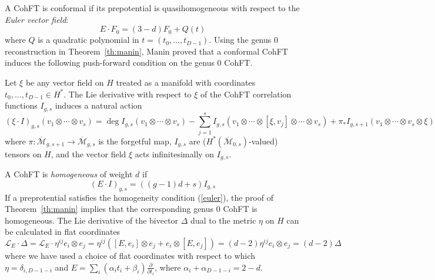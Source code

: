 \documentclass[11pt]{article}
\newcommand{\modm}{\mathcal{M}}
\theoremstyle{plain}
\theoremstyle{definition}
\newcommand{\cl}{\mathcal{L}}
\begin{document}
A CohFT is conformal if its prepotential is quasihomogeneous with respect to the {\em Euler vector field}:
\begin{equation}  \label{euler}
 E\cdot F_0=(3-d)F_0+Q(t)
 \end{equation}
where $Q$ is a quadratic polynomial in $t=(t_0,\dots,t_{D-1})$.  Using the genus 0 reconstruction in Theorem~\ref{th:manin}, Manin proved that a conformal CohFT induces the following push-forward condition on the genus 0 CohFT.

Let $\xi$ be any vector field on $H$ treated as a manifold with coordinates $t_0,\dots,t_{D-1}\in H^*$.   The Lie derivative with respect to $\xi$ of the CohFT correlation functions $I_{g,s}$  induces a natural action
$$
(\xi\cdot I)_{g,s}(v_1\otimes\cdots\otimes v_s)=\deg I_{g,s}(v_1\otimes\cdots\otimes v_s)-\sum_{j=1}^s I_{g,s}(v_1\otimes\cdots \otimes[\xi,v_j]\otimes\cdots \otimes v_s)+\pi_*I_{g,s+1}(v_1\otimes\cdots \otimes v_s\otimes\xi)
$$
where $\pi:\overline{\modm}_{g,s+1}\to\overline{\modm}_{g,s}$ is the forgetful map,
 $I_{g,s}$ are  ($H^*(\overline{\modm}_{0,s})$-valued) tensors on $H$, and the vector field $\xi$ acts infinitesimally on $I_{g,s}$.



A CohFT is {\em homogeneous} of weight $d$ if
\begin{equation}  \label{homog}
(E\cdot I)_{g,s}=((g-1)d+s)I_{g,s}
 \end{equation}
If a preprotential satisfies the homogeneity condition (\ref{euler}), the proof of Theorem~\ref{th:manin} implies that the corresponding
genus 0 CohFT is homogeneous.  The Lie derivative of the bivector $\Delta$ dual to the metric $\eta$ on $H$ can be calculated in flat coordinates
$$
\cl_E\cdot\Delta=\cl_E\cdot\eta^{ij}e_i\otimes e_j=\eta^{ij}([E,e_i]\otimes e_j+e_i\otimes [E,e_j])=(d-2)\eta^{ij}e_i\otimes e_j=(d-2)\Delta
$$
where we have used a choice of flat coordinates \cite{DubGeo} with respect to which $\eta=\delta_{i,D-1-i}$ and
$E=\sum_i(\alpha_it_i+\beta_i)\frac{\partial}{\partial t_i}$, where $\alpha_i+\alpha_{D-1-i}=2-d$.
\end{document}
